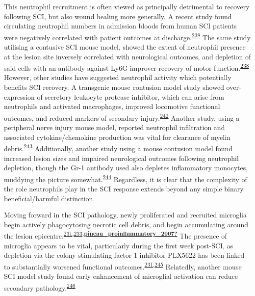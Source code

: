 \documentclass[
]{article}
\begin{document}
This neutrophil recruitment is often viewed as principally detrimental to recovery following SCI, but also wound healing more generally.
A recent study found circulating neutrophil numbers in admission bloods from human SCI patients were negatively correlated with patient outcomes at discharge.\textsuperscript{\protect\hyperlink{ref-brennan_complement_2019}{238}}
The same study utilising a contusive SCI mouse model, showed the extent of neutrophil presence at the lesion site inversely correlated with neurological outcomes, and depletion of said cells with an antibody against Ly6G improver recovery of motor function.\textsuperscript{\protect\hyperlink{ref-brennan_complement_2019}{238}}
However, other studies have suggested neutrophil activity which potentially benefits SCI recovery.
A transgenic mouse contusion model study showed over-expression of secretory leukocyte protease inhibitor, which can arise from neutrophils and activated macrophages, improved locomotive functional outcomes, and reduced markers of secondary injury.\textsuperscript{\protect\hyperlink{ref-ghasemlou_beneficial_2010}{242}}
Another study, using a peripheral nerve injury mouse model, reported neutrophil infiltration and associated cytokine/chemokine production was vital for clearance of myelin debris.\textsuperscript{\protect\hyperlink{ref-lindborg_neutrophils_2017}{243}}
Additionally, another study using a mouse contusion model found increased lesion sizes and impaired neurological outcomes following neutrophil depletion, though the Gr-1 antibody used also depletes inflammatory monocytes, muddying the picture somewhat.\textsuperscript{\protect\hyperlink{ref-stirling_depletion_2009}{244}}
Regardless, it is clear that the complexity of the role neutrophils play in the SCI response extends beyond any simple binary beneficial/harmful distinction.

Moving forward in the SCI pathology, newly proliferated and recruited microglia begin actively phagocytosing necrotic cell debris, and begin accumulating around the lesion epicentre.\textsuperscript{\protect\hyperlink{ref-bellver-landete_microglia_2019}{231},\protect\hyperlink{ref-greenhalgh_differences_2014}{233},\protect\hyperlink{ref-pineau_proinflammatory_2007}{\textbf{pineau\_proinflammatory\_2007?}}}
The presence of microglia appears to be vital, particularly during the first week post-SCI, as depletion via the colony stimulating factor-1 inhibitor PLX5622 has been linked to substantially worsened functional outcomes.\textsuperscript{\protect\hyperlink{ref-bellver-landete_microglia_2019}{231},\protect\hyperlink{ref-brennan_microglia_2018}{245}}
Relatedly, another mouse SCI model study found early enhancement of microglial activation can reduce secondary pathology.\textsuperscript{\protect\hyperlink{ref-stirling_toll-like_2014}{246}}
\end{document}

